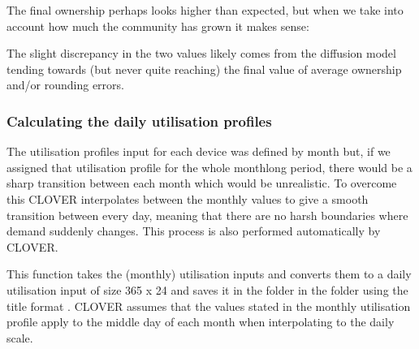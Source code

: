 \documentclass[letterpaper,10pt,english]{sphinxmanual}
\begin{document}
\begin{sphinxVerbatim}[commandchars=\\\{\}]
    
    
\end{sphinxVerbatim}

\sphinxAtStartPar
The final  ownership perhaps looks higher than expected, but
when we take into account how much the community has grown it makes
sense:

\sphinxAtStartPar
The slight discrepancy in the two values likely comes from the diffusion
model tending towards (but never quite reaching) the final value of
average ownership and/or rounding errors.


\subsubsection{Calculating the daily utilisation profiles}
\label{\detokenize{load:calculating-the-daily-utilisation-profiles}}
\sphinxAtStartPar
The utilisation profiles input for each device was defined by month but,
if we assigned that utilisation profile for the whole month\sphinxhyphen{}long period,
there would be a sharp transition between each month which would be
unrealistic. To overcome this CLOVER interpolates between the monthly
values to give a smooth transition between every day, meaning that there
are no harsh boundaries where demand suddenly changes. This process is
also performed automatically by CLOVER. 

\begin{sphinxVerbatim}[commandchars=\\\{\}]
\end{sphinxVerbatim}

\sphinxAtStartPar
This function takes the (monthly) utilisation inputs and converts them
to a daily utilisation input of size 365 x 24 and saves it in the
 folder in the  folder using the title format
. CLOVER assumes that the values stated in
the monthly utilisation profile apply to the middle day of each month
when interpolating to the daily scale.
\end{document}
